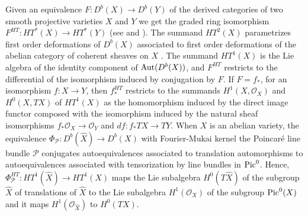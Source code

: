 \documentclass[12pt]{amsart}
\numberwithin{equation}{subsection}
\theoremstyle{plain}
\theoremstyle{definition}
\renewcommand{\P}{{\mathcal P}}
\newcommand{\StructureSheaf}[1]{{\mathcal O}_{#1}}
\newcommand{\Pic}{{\rm Pic}}
\newcommand{\Aut}{{\rm Aut}}
\begin{document}
Given an equivalence $F:D^b(X)\rightarrow D^b(Y)$ of the derived categories of two smooth projective varieties $X$ and $Y$ we get the graded ring isomorphism 
$F^{HT}:HT^*(X)\rightarrow HT^*(Y)$ (see \cite[Cor. 8.3]{caldararu-I} and \cite[Theorem 1.4]{calaque-et-al}). The summand $HT^2(X)$ parametrizes first order deformations of $D^b(X)$ associated to first order deformations of the abelian category of coherent sheaves on $X$ \cite{toda}.
The summand $HT^1(X)$ is the Lie algebra of the identity component of $\Aut(D^b(X))$, and $F^{HT}$ restricts to the differential of the isomorphism induced by conjugation by $F$. If $F=f_*$, for an isomorphism $f:X\rightarrow Y$, then $f_*^{HT}$ restricts to the summands $H^1(X,\StructureSheaf{X})$ and $H^0(X,TX)$
of $HT^1(X)$ as the homomorphism induced by the direct image functor composed with the isomorphism induced by the natural sheaf isomorphisms $f_*\StructureSheaf{X}\rightarrow\StructureSheaf{Y}$ and $df:f_*TX\rightarrow TY$. When $X$ is an abelian variety, the equivalence $\Phi_\P:D^b(\hat{X})\rightarrow D^b(X)$ with Fourier-Mukai kernel the Poincar\'{e} line bundle $\P$ conjugates autoequivalences associated to translation automorphisms to autoequivalences associated with tensorization by line bundles in $\Pic^0$. Hence, $\Phi_\P^{HT}:HT^1(\hat{X})\rightarrow HT^1(X)$ maps the Lie subalgebra $H^0(T\hat{X})$ of the subgroup $\hat{X}$ of translations of $\hat{X}$ to the Lie subalgebra $H^1(\StructureSheaf{X})$ of the subgroup $\Pic^0(X)$ and it maps $H^1(\StructureSheaf{\hat{X}})$ to $H^0(TX)$.
\end{document}
